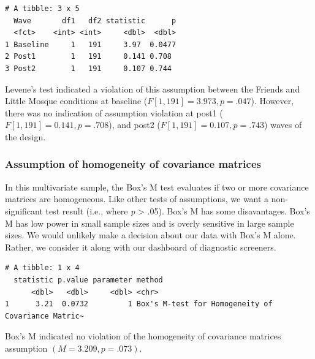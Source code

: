 \documentclass[
  11pt,
]{book}
\newenvironment{Shaded}{\begin{snugshade}}{\end{snugshade}}
\newcommand{\AttributeTok}[1]{\textcolor[rgb]{0.27,0.27,0.27}{#1}}
\newcommand{\ConstantTok}[1]{\textcolor[rgb]{0.37,0.37,0.37}{#1}}
\newcommand{\FunctionTok}[1]{\textcolor[rgb]{0.27,0.27,0.27}{\textbf{#1}}}
\newcommand{\NormalTok}[1]{#1}
\newcommand{\SpecialCharTok}[1]{\textcolor[rgb]{0.43,0.43,0.43}{\textbf{#1}}}
\newcommand{\StringTok}[1]{\textcolor[rgb]{0.5,0.5,0.5}{#1}}
\begin{document}
\begin{verbatim}
# A tibble: 3 x 5
  Wave       df1   df2 statistic      p
  <fct>    <int> <int>     <dbl>  <dbl>
1 Baseline     1   191     3.97  0.0477
2 Post1        1   191     0.141 0.708 
3 Post2        1   191     0.107 0.744 
\end{verbatim}

Levene's test indicated a violation of this assumption between the Friends and Little Mosque conditions at baseline (\(F[1, 191] = 3.973, p = .047\)). However, there was no indication of assumption violation at post1 (\(F[1, 191] = 0.141, p = .708\)), and post2 (\(F[1, 191] = 0.107, p = .743\)) waves of the design.

\hypertarget{assumption-of-homogeneity-of-covariance-matrices}{%
\subsubsection{Assumption of homogeneity of covariance matrices}\label{assumption-of-homogeneity-of-covariance-matrices}}

In this multivariate sample, the Box's M test evaluates if two or more covariance matrices are homogeneous. Like other tests of assumptions, we want a non-significant test result (i.e., where \emph{p} \textgreater{} .05). Box's M has some disavantages. Box's M has low power in small sample sizes and is overly sensitive in large sample sizes. We would unlikely make a decision about our data with Box's M alone. Rather, we consider it along with our dashboard of diagnostic screeners.

\begin{Shaded}
\end{Shaded}

\begin{verbatim}
# A tibble: 1 x 4
  statistic p.value parameter method                                            
      <dbl>   <dbl>     <dbl> <chr>                                             
1      3.21  0.0732         1 Box's M-test for Homogeneity of Covariance Matric~
\end{verbatim}

Box's M indicated no violation of the homogeneity of covariance matrices assumption \((M = 3.209, p = .073)\).
\end{document}
